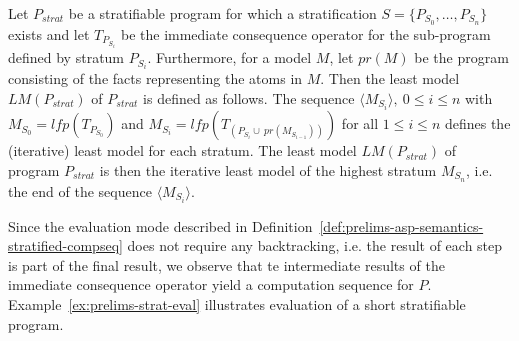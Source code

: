 \begin{definition}
\label{def:prelims-asp-semantics-stratified-compseq}
Let $P_{strat}$ be a stratifiable program for which a stratification $S = \{P_{S_0},\ldots,P_{S_n}\}$ exists and let $T_{P_{S_i}}$ be the immediate consequence operator for the sub-program defined by stratum $P_{S_i}$. Furthermore, for a model $M$, let $pr(M)$ be the program consisting of the facts representing the atoms in $M$.
Then the least model $LM(P_{strat})$ of $P_{strat}$ is defined as follows.
The sequence $\langle M_{S_i} \rangle,\ 0 \leq i \leq n$ with $M_{S_0} = \mathit{lfp}(T_{P_{S_0}})$ and $M_{S_i} = \mathit{lfp}(T_{(P_{S_{i}} \cup\ pr(M_{S_{i-1}}))})$ for all $1 \leq i \leq n$ defines the (iterative) least model for each stratum. The least model $LM(P_{strat})$ of program $P_{strat}$ is then the iterative least model of the highest stratum $M_{S_n}$, i.e. the end of the sequence $\langle M_{S_i} \rangle$.
\end{definition}

Since the evaluation mode described in Definition~\ref{def:prelims-asp-semantics-stratified-compseq} does not require any backtracking, i.e. the result of each step is part of the final result, we observe that te intermediate results of the immediate consequence operator yield a computation sequence for $P$. Example~\ref{ex:prelims-strat-eval} illustrates evaluation of a short stratifiable program.

